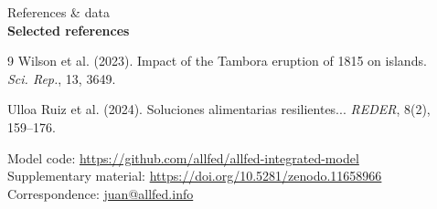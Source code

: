 \documentclass[final]{beamer}
\newlength{\sepwidth}
\newlength{\colwidth}
\newenvironment{labelblock}[2]{%
  \begin{block}{%
      {\small\color{structure.fg!70!bg}#1}%
      \\[2pt]                                  %
      {\large\bfseries#2}%
      }%
      }{%
  \end{block}%
  }
\newcommand{\separatorcolumn}{\begin{column}{\sepwidth}\end{column}}
\begin{document}
\begin{frame}[t]
\begin{columns}[t]
\begin{column}{\colwidth}
\begin{labelblock}{References \& data}{Selected references}
\begin{thebibliography}{9}
            Wilson et al. (2023).
            \newblock Impact of the Tambora eruption of 1815 on islands.
            \newblock \emph{Sci. Rep.}, 13, 3649.

            Ulloa Ruiz et al. (2024).
            \newblock Soluciones alimentarias resilientes...
            \newblock \emph{REDER}, 8(2), 159--176.
        \end{thebibliography}

        \vspace{0.5cm}
        \scriptsize
        Model code: \url{https://github.com/allfed/allfed-integrated-model} \\
        Supplementary material: \url{https://doi.org/10.5281/zenodo.11658966} \\
        Correspondence: \href{mailto:juan@allfed.info}{juan@allfed.info}
      \end{labelblock}
    \end{column}

    \separatorcolumn
  \end{columns}

\end{frame}
\end{document}
